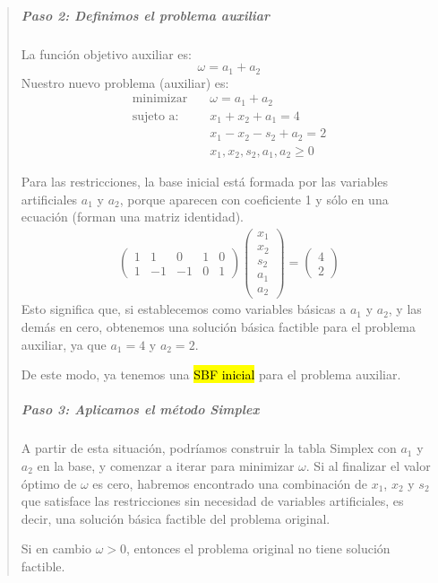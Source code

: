 \begin{quote}
  \subparagraph{Paso 2: Definimos el problema auxiliar}
  
  La función objetivo auxiliar es:
  \[
    \omega = a_1 + a_2
  \]
  Nuestro nuevo problema (auxiliar) es:
  \begin{align*}
    \text{minimizar} \quad  &\omega = a_1 + a_2\\[3pt]
    \text{sujeto a:} \quad  &x_1 + x_2 + a_1 = 4\\
                            &x_1 - x_2 - s_2 + a_2 = 2\\
                            &x_1, x_2, s_2, a_1, a_2 \geq 0
  \end{align*}

  Para las restricciones, la base inicial está formada por las variables artificiales \(a_1\) y \(a_2\), porque aparecen con coeficiente 1 y sólo en una ecuación (forman una matriz identidad).
  \begin{align*}
    \begin{pmatrix}
      1 & 1 & 0 & 1 & 0\\
      1 & -1 & -1 & 0 & 1
    \end{pmatrix}
    \begin{pmatrix}
      x_1\\
      x_2\\
      s_2\\
      a_1\\
      a_2
    \end{pmatrix}
    =
    \begin{pmatrix}
      4\\
      2
    \end{pmatrix}
  \end{align*}
  Esto significa que, si establecemos como variables básicas a \(a_1\) y \(a_2\), y las demás en cero, obtenemos una solución básica factible para el problema auxiliar, ya que \(a_1 = 4\) y \(a_2 = 2\).

  De este modo, ya tenemos una \hl{SBF inicial} para el problema auxiliar.
  
  \subparagraph{Paso 3: Aplicamos el método Simplex}
  
  A partir de esta situación, podríamos construir la tabla Simplex con \(a_1\) y \(a_2\) en la base, y comenzar a iterar para minimizar \(\omega\). Si al finalizar el valor óptimo de \(\omega\) es cero, habremos encontrado una combinación de \(x_1\), \(x_2\) y \(s_2\) que satisface las restricciones sin necesidad de variables artificiales, es decir, una solución básica factible del problema original.
  
  Si en cambio \(\omega > 0\), entonces el problema original no tiene solución factible.  
\end{quote}


